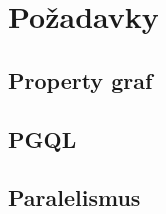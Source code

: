 
\chapter{Požadavky}
\label{requirements}

\section{Property graf}
\label{req.propGraph}

\section{PGQL}
\label{req.pgql}

\section{Paralelismus}
\label{req.paralel}
